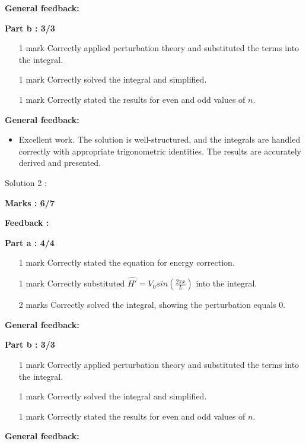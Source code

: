 \documentclass[a4paper,11pt]{article}
\begin{document}
\textbf{General feedback:}


\textbf{Part b : 3/3}

\begin{itemize}
    \item [1 mark] Correctly applied perturbation theory and substituted the terms into the integral.
    \item [1 mark] Correctly solved the integral and simplified.
    \item [1 mark] Correctly stated the results for even and odd values of $n$.
\end{itemize}

\textbf{General feedback:}

\begin{itemize}
    \item Excellent work. The solution is well-structured, and the integrals are handled correctly with appropriate trigonometric identities. The results are accurately derived and presented.
\end{itemize}



Solution 2 :

\textbf{Marks : 6/7}

\textbf{Feedback :}

\textbf{Part a : 4/4}

\begin{itemize}
    \item [1 mark] Correctly stated the equation for energy correction.
    \item [1 mark] Correctly substituted $\hat{H'} = V_{0}sin(\frac{2\pi x}{L})$ into the integral.
    \item [2 marks] Correctly solved the integral, showing the perturbation equals 0.
\end{itemize}

\textbf{General feedback:}


\textbf{Part b : 3/3}

\begin{itemize}
    \item [1 mark] Correctly applied perturbation theory and substituted the terms into the integral.
    \item [1 mark] Correctly solved the integral and simplified.
    \item [1 mark] Correctly stated the results for even and odd values of $n$.
\end{itemize}

\textbf{General feedback:}
\end{document}
